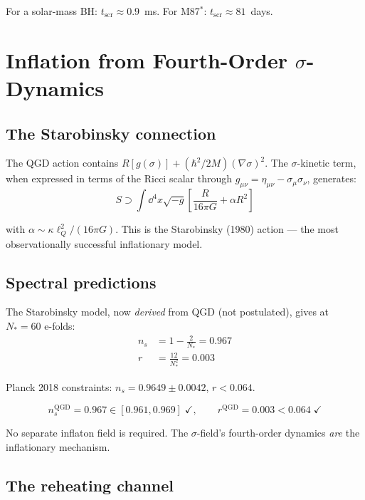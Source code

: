\documentclass[11pt,a4paper]{article}
\theoremstyle{plain}
\theoremstyle{definition}
\theoremstyle{remark}
\newcommand{\lQ}{\ell_Q}
\begin{document}
For a solar-mass BH: $t_{\mathrm{scr}} \approx 0.9$~ms.  For M87$^*$: $t_{\mathrm{scr}} \approx 81$~days.

\section{Inflation from Fourth-Order $\sigma$-Dynamics}
\label{sec:inflation}

\subsection{The Starobinsky connection}

The QGD action contains $R[g(\sigma)] + (\hbar^2/2M)(\nabla\sigma)^2$.  The $\sigma$-kinetic term, when expressed in terms of the Ricci scalar through $g_{\mu\nu} = \eta_{\mu\nu} - \sigma_\mu\sigma_\nu$, generates:
\begin{equation}
  S \supset \int\dd^4x\sqrt{-g}\left[\frac{R}{16\pi G} + \alpha R^2\right]
\end{equation}

with $\alpha \sim \kappa\lQ^2/(16\pi G)$.  This is the Starobinsky (1980) action --- the most observationally successful inflationary model.

\subsection{Spectral predictions}

The Starobinsky model, now \emph{derived} from QGD (not postulated), gives at $N_* = 60$ e-folds:
\begin{align}
  n_s &= 1 - \frac{2}{N_*} = 0.967 \\
  r &= \frac{12}{N_*^2} = 0.003
\end{align}

Planck 2018 constraints: $n_s = 0.9649 \pm 0.0042$, $r < 0.064$.

\begin{equation}
  \boxed{n_s^{\mathrm{QGD}} = 0.967 \in [0.961, 0.969] \;\checkmark, \qquad r^{\mathrm{QGD}} = 0.003 < 0.064 \;\checkmark}
\end{equation}

No separate inflaton field is required.  The $\sigma$-field's fourth-order dynamics \emph{are} the inflationary mechanism.

\subsection{The reheating channel}
\end{document}
